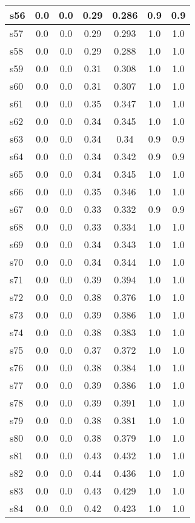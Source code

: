 \documentclass{article}
\begin{document}
\begin{tabular}{|l|c|c|c|c|c|c|}
\hline
s56 &0.0 & 0.0 & 0.29 & 0.286 & 0.9 & 0.9\\
\hline
s57 &0.0 & 0.0 & 0.29 & 0.293 & 1.0 & 1.0\\
\hline
s58 &0.0 & 0.0 & 0.29 & 0.288 & 1.0 & 1.0\\
\hline
s59 &0.0 & 0.0 & 0.31 & 0.308 & 1.0 & 1.0\\
\hline
s60 &0.0 & 0.0 & 0.31 & 0.307 & 1.0 & 1.0\\
\hline
s61 &0.0 & 0.0 & 0.35 & 0.347 & 1.0 & 1.0\\
\hline
s62 &0.0 & 0.0 & 0.34 & 0.345 & 1.0 & 1.0\\
\hline
s63 &0.0 & 0.0 & 0.34 & 0.34 & 0.9 & 0.9\\
\hline
s64 &0.0 & 0.0 & 0.34 & 0.342 & 0.9 & 0.9\\
\hline
s65 &0.0 & 0.0 & 0.34 & 0.345 & 1.0 & 1.0\\
\hline
s66 &0.0 & 0.0 & 0.35 & 0.346 & 1.0 & 1.0\\
\hline
s67 &0.0 & 0.0 & 0.33 & 0.332 & 0.9 & 0.9\\
\hline
s68 &0.0 & 0.0 & 0.33 & 0.334 & 1.0 & 1.0\\
\hline
s69 &0.0 & 0.0 & 0.34 & 0.343 & 1.0 & 1.0\\
\hline
s70 &0.0 & 0.0 & 0.34 & 0.344 & 1.0 & 1.0\\
\hline
s71 &0.0 & 0.0 & 0.39 & 0.394 & 1.0 & 1.0\\
\hline
s72 &0.0 & 0.0 & 0.38 & 0.376 & 1.0 & 1.0\\
\hline
s73 &0.0 & 0.0 & 0.39 & 0.386 & 1.0 & 1.0\\
\hline
s74 &0.0 & 0.0 & 0.38 & 0.383 & 1.0 & 1.0\\
\hline
s75 &0.0 & 0.0 & 0.37 & 0.372 & 1.0 & 1.0\\
\hline
s76 &0.0 & 0.0 & 0.38 & 0.384 & 1.0 & 1.0\\
\hline
s77 &0.0 & 0.0 & 0.39 & 0.386 & 1.0 & 1.0\\
\hline
s78 &0.0 & 0.0 & 0.39 & 0.391 & 1.0 & 1.0\\
\hline
s79 &0.0 & 0.0 & 0.38 & 0.381 & 1.0 & 1.0\\
\hline
s80 &0.0 & 0.0 & 0.38 & 0.379 & 1.0 & 1.0\\
\hline
s81 &0.0 & 0.0 & 0.43 & 0.432 & 1.0 & 1.0\\
\hline
s82 &0.0 & 0.0 & 0.44 & 0.436 & 1.0 & 1.0\\
\hline
s83 &0.0 & 0.0 & 0.43 & 0.429 & 1.0 & 1.0\\
\hline
s84 &0.0 & 0.0 & 0.42 & 0.423 & 1.0 & 1.0\\

\end{tabular}
\end{document}
